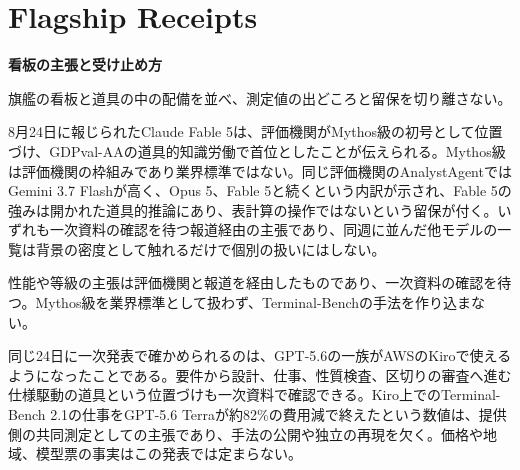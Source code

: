 \section{Flagship Receipts}
\begin{wideflow}
{\Large\bfseries 看板の主張と受け止め方}\par
\smallskip
{\color{SurveyMuted}旗艦の看板と道具の中の配備を並べ、測定値の出どころと留保を切り離さない。}\par
\end{wideflow}

8月24日に報じられたClaude Fable 5は、評価機関がMythos級の初号として位置づけ、GDPval-AAの道具的知識労働で首位としたことが伝えられる\cite{fable5}。Mythos級は評価機関の枠組みであり業界標準ではない。同じ評価機関のAnalystAgentではGemini 3.7 Flashが高く、Opus 5、Fable 5と続くという内訳が示され、Fable 5の強みは開かれた道具的推論にあり、表計算の操作ではないという留保が付く。いずれも一次資料の確認を待つ報道経由の主張であり、同週に並んだ他モデルの一覧は背景の密度として触れるだけで個別の扱いにはしない。

\begin{claimboundary}[未解決の境界]
性能や等級の主張は評価機関と報道を経由したものであり、一次資料の確認を待つ。Mythos級を業界標準として扱わず、Terminal-Benchの手法を作り込まない。
\end{claimboundary}

同じ24日に一次発表で確かめられるのは、GPT-5.6の一族がAWSのKiroで使えるようになったことである\cite{gpt56kiro}。要件から設計、仕事、性質検査、区切りの審査へ進む仕様駆動の道具という位置づけも一次資料で確認できる。Kiro上でのTerminal-Bench 2.1の仕事をGPT-5.6 Terraが約82\%の費用減で終えたという数値は、提供側の共同測定としての主張であり、手法の公開や独立の再現を欠く。価格や地域、模型票の事実はこの発表では定まらない。
